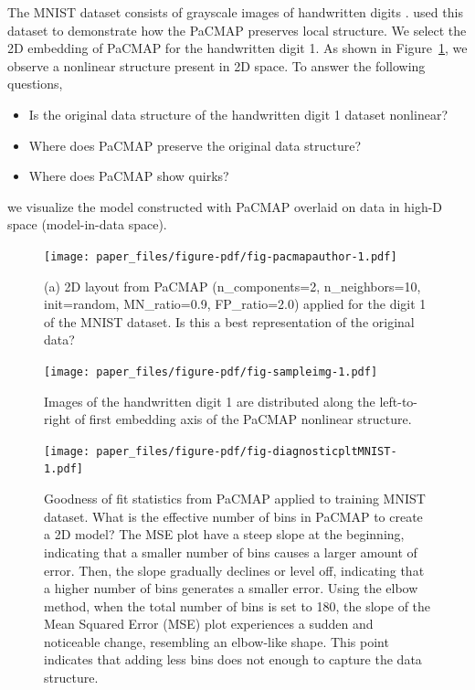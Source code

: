 \documentclass[
  12pt]{article}
\providecommand{\tightlist}{%
  \setlength{\itemsep}{0pt}\setlength{\parskip}{0pt}}\usepackage{longtable,booktabs,array}
\begin{document}
The MNIST dataset consists of grayscale images of handwritten digits
\citep{lecun2010}. \citet{Yingfan2021} used this dataset to demonstrate
how the PaCMAP preserves local structure. We select the 2D embedding of
PaCMAP for the handwritten digit 1. As shown in
Figure~\ref{fig-pacmapauthor}, we observe a nonlinear structure present
in 2D space. To answer the following questions,

\begin{itemize}
\tightlist
\item
  Is the original data structure of the handwritten digit 1 dataset
  nonlinear?
\item
  Where does PaCMAP preserve the original data structure?
\item
  Where does PaCMAP show quirks?
\end{itemize}

we visualize the model constructed with PaCMAP overlaid on data in
high-D space (model-in-data space).

\begin{figure}[H]

{\centering \texttt{[image: paper\_files/figure-pdf/fig-pacmapauthor-1.pdf]}

}

\caption{\label{fig-pacmapauthor}(a) 2D layout from PaCMAP
(n\_components=2, n\_neighbors=10, init=random, MN\_ratio=0.9,
FP\_ratio=2.0) applied for the digit 1 of the MNIST dataset. Is this a
best representation of the original data?}

\end{figure}

\begin{figure}[H]

{\centering \texttt{[image: paper\_files/figure-pdf/fig-sampleimg-1.pdf]}

}

\caption{\label{fig-sampleimg}Images of the handwritten digit 1 are
distributed along the left-to-right of first embedding axis of the
PaCMAP nonlinear structure.}

\end{figure}

\begin{figure}[H]

{\centering \texttt{[image: paper\_files/figure-pdf/fig-diagnosticpltMNIST-1.pdf]}

}

\caption{\label{fig-diagnosticpltMNIST}Goodness of fit statistics from
PaCMAP applied to training MNIST dataset. What is the effective number
of bins in PaCMAP to create a 2D model? The MSE plot have a steep slope
at the beginning, indicating that a smaller number of bins causes a
larger amount of error. Then, the slope gradually declines or level off,
indicating that a higher number of bins generates a smaller error. Using
the elbow method, when the total number of bins is set to 180, the slope
of the Mean Squared Error (MSE) plot experiences a sudden and noticeable
change, resembling an elbow-like shape. This point indicates that adding
less bins does not enough to capture the data structure.}

\end{figure}
\end{document}
